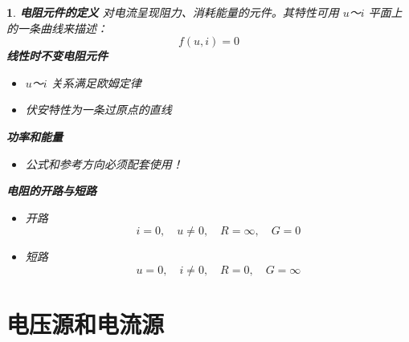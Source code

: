 \documentclass[UTF8]{report}
\theoremstyle{MyLineTheoremStyle} %
\theoremstyle{MyBlockTheoremStyle} %
\theoremstyle{MySubsubsectionStyle} %
\newtheorem{definition}{}
\begin{document}
\begin{definition}
    \textbf{电阻元件的定义} 对电流呈现阻力、消耗能量的元件。其特性可用 $u$～$i$ 平面上的一条曲线来描述：
    \[
    f(u, i) = 0
    \]
    \textbf{线性时不变电阻元件}
    \begin{itemize}
        \item $u$～$i$ 关系满足欧姆定律
        \item 伏安特性为一条过原点的直线
    \end{itemize}
    \textbf{功率和能量}
    \begin{itemize}
        \item 公式和参考方向必须配套使用！
    \end{itemize}
    \textbf{电阻的开路与短路}
    \begin{itemize}
        \item 开路
        \[
        i = 0, \quad u \neq 0, \quad R = \infty, \quad G = 0
        \]
        \item 短路
        \[
        u = 0, \quad i \neq 0, \quad R = 0, \quad G = \infty
        \]
    \end{itemize}
\end{definition}

\section{电压源和电流源}
\end{document}
